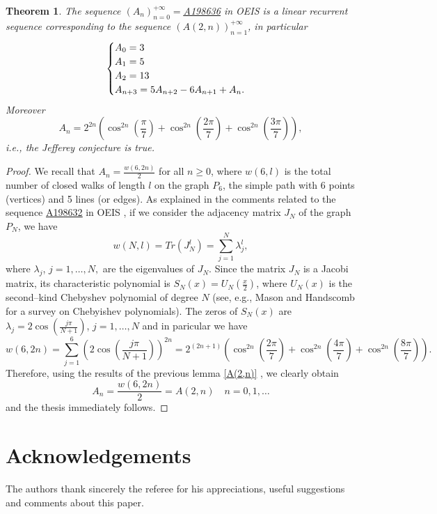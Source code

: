 \documentclass[12pt,reqno]{article}
\newtheorem{theorem}{Theorem}
\newcommand{\seqnum}[1]{\href{http://www.research.att.com/cgi-bin/access.cgi/as/~njas/sequences/eisA.cgi?Anum=#1}{\underline{#1}}}
\begin{document}
\begin{theorem}
The sequence  $(A_n)_{n=0}^{+\infty}=$\seqnum{A198636} in OEIS \cite{oeis} is a linear recurrent sequence corresponding to the sequence $(A(2,n))_{n=1}^{+\infty}$, in particular 
$$\begin{cases} A_0=3 \cr A_1=5 \cr A_2=13 \cr A_{n+3}=5A_{n+2}-6A_{n+1}+A_n.\end{cases}$$
Moreover
$$A_n=2^{2n}\left(\cos^{2n}\left(\frac{\pi}{7}\right)+\cos^{2n}\left(\frac{2\pi}{7}\right)+\cos^{2n}\left(\frac{3\pi}{7}\right)\right),$$
i.e., the Jefferey conjecture is true.
\end{theorem}
\begin{proof}
We recall that $A_n= \frac{w(6,2n)}{2}$ for all $n\geq0$, where $w(6,l)$ is the total number of closed walks of length $l$ on the graph $P_6$, the simple path with 6 points (vertices) and 5 lines (or edges). 
As explained in the comments related to the sequence \seqnum{A198632} in OEIS \cite{oeis}, if we consider the adjacency matrix $J_N$ of the graph $P_N$, we have $$w(N,l)=Tr(J_N^l)=\sum_{j=1}^{N}\lambda_{j}^{l},$$
where $\lambda_j$, $j=1,\ldots,N,$ are the eigenvalues of $J_N$.
Since the matrix $J_N$ is a Jacobi matrix, its characteristic polynomial is $S_N(x)=U_N(\frac{x}{2})$, where $U_N(x)$ is the second--kind Chebyshev polynomial of degree $N$  
(see, e.g., Mason and Handscomb \cite{Mason} for a survey on Chebyishev polynomials).
The zeros of $S_N(x)$ are $\lambda_j=2\cos\left(\frac{j\pi}{N+1}\right)$, $j=1,\ldots,N$ and in paricular we have
$$ w(6,2n)=\sum_{j=1}^{6}\left(2\cos\left(\frac{j\pi}{N+1}\right)\right)^{2n}=2^{(2n+1)}\left(\cos^{2n}\left(\frac{2\pi}{7}\right)+\cos^{2n}\left(\frac{4\pi}{7}\right)+\cos^{2n}\left(\frac{8\pi}{7}\right)\right).$$
Therefore, using the results of the previous lemma \ref{A(2,n)} , we clearly obtain  $$A_n=\frac{w(6,2n)}{2}=A(2,n) \quad n=0,1,\ldots $$ and the thesis immediately follows.
\end{proof}
\section{Acknowledgements}
The authors thank sincerely the referee for his appreciations, useful suggestions and comments about this paper.
\end{document}
